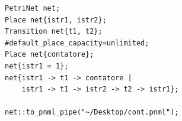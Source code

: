 \documentclass[italian,12pt]{book}
\begin{document}
\begin{verbatim}PetriNet net;
Place net{istr1, istr2};
Transition net{t1, t2};
#default_place_capacity=unlimited;
Place net{contatore};
net{istr1 = 1};
net{istr1 -> t1 -> contatore | 
    istr1 -> t1 -> istr2 -> t2 -> istr1};

net::to_pnml_pipe("~/Desktop/cont.pnml");

\end{verbatim}

%


\end{document}
